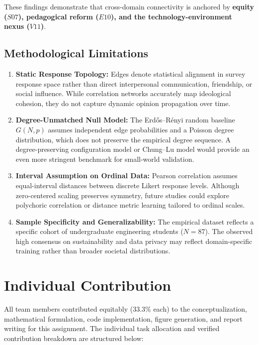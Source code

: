 \documentclass[10pt,twocolumn,a4paper]{article}
\begin{document}
These findings demonstrate that cross-domain connectivity is anchored by \textbf{equity ($S07$), pedagogical reform ($E10$), and the technology-environment nexus ($V11$)}.

\subsection{Methodological Limitations}
\begin{enumerate}[noitemsep,topsep=1pt,leftmargin=1.2em]
    \item \textbf{Static Response Topology:} Edges denote statistical alignment in survey response space rather than direct interpersonal communication, friendship, or social influence. While correlation networks accurately map ideological cohesion, they do not capture dynamic opinion propagation over time.
    \item \textbf{Degree-Unmatched Null Model:} The Erd\H{o}s--R\'enyi random baseline $G(N, p)$ assumes independent edge probabilities and a Poisson degree distribution, which does not preserve the empirical degree sequence. A degree-preserving configuration model or Chung--Lu model would provide an even more stringent benchmark for small-world validation.
    \item \textbf{Interval Assumption on Ordinal Data:} Pearson correlation assumes equal-interval distances between discrete Likert response levels. Although zero-centered scaling preserves symmetry, future studies could explore polychoric correlation or distance metric learning tailored to ordinal scales.
    \item \textbf{Sample Specificity and Generalizability:} The empirical dataset reflects a specific cohort of undergraduate engineering students ($N=87$). The observed high consensus on sustainability and data privacy may reflect domain-specific training rather than broader societal distributions.
\end{enumerate}

\section{Individual Contribution}
\label{sec:contribution}

All team members contributed equitably ($33.3\%$ each) to the conceptualization, mathematical formulation, code implementation, figure generation, and report writing for this assignment. The individual task allocation and verified contribution breakdown are structured below:
\end{document}
